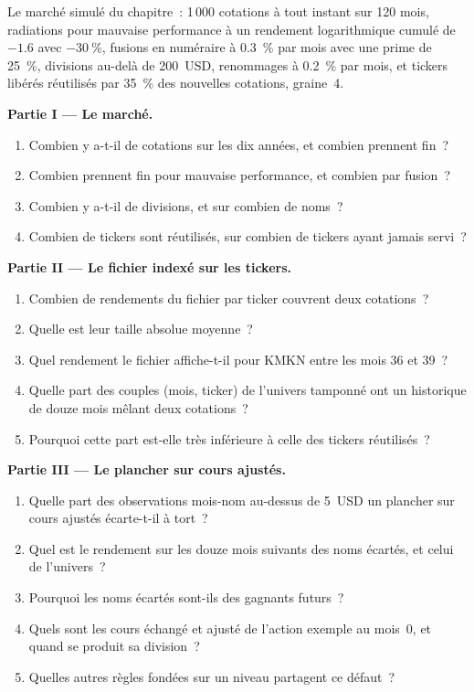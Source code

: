 \begin{problem}\label{pb:rs:universe-symbology-and-corporate-actions:1}
Le marché simulé du chapitre~: 1\,000 cotations à tout instant sur 120 mois, radiations pour mauvaise performance à un rendement logarithmique cumulé
de $-1.6$ avec $-30~\%$, fusions en numéraire à 0.3~\% par mois avec une prime de 25~\%, divisions au-delà de 200~USD, renommages à 0.2~\% par mois, et
tickers libérés réutilisés par 35~\% des nouvelles cotations, graine~4.

\medskip\noindent\textbf{Partie I --- Le marché.}
\begin{enumerate}
\item Combien y a-t-il de cotations sur les dix années, et combien prennent fin~?
\item Combien prennent fin pour mauvaise performance, et combien par fusion~?
\item Combien y a-t-il de divisions, et sur combien de noms~?
\item Combien de tickers sont réutilisés, sur combien de tickers ayant jamais servi~?
\end{enumerate}

\medskip\noindent\textbf{Partie II --- Le fichier indexé sur les tickers.}
\begin{enumerate}[resume]
\item Combien de rendements du fichier par ticker couvrent deux cotations~?
\item Quelle est leur taille absolue moyenne~?
\item Quel rendement le fichier affiche-t-il pour KMKN entre les mois 36 et 39~?
\item Quelle part des couples (mois, ticker) de l'univers tamponné ont un historique de douze mois mêlant deux cotations~?
\item Pourquoi cette part est-elle très inférieure à celle des tickers réutilisés~?
\end{enumerate}

\medskip\noindent\textbf{Partie III --- Le plancher sur cours ajustés.}
\begin{enumerate}[resume]
\item Quelle part des observations mois-nom au-dessus de 5~USD un plancher sur cours ajustés écarte-t-il à tort~?
\item Quel est le rendement sur les douze mois suivants des noms écartés, et celui de l'univers~?
\item Pourquoi les noms écartés sont-ils des gagnants futurs~?
\item Quels sont les cours échangé et ajusté de l'action exemple au mois~0, et quand se produit sa division~?
\item Quelles autres règles fondées sur un niveau partagent ce défaut~?
\end{enumerate}


\end{problem}
